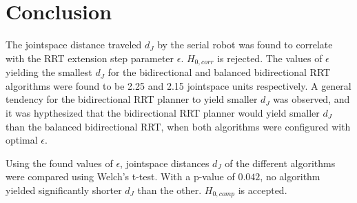 \section{Conclusion} 
The jointspace distance traveled \(d_J\) by the serial robot was
found to correlate with the RRT extension step parameter \(\epsilon\).
\(H_{0,corr}\) is rejected.
The values of \(\epsilon\) yielding the smallest \(d_J\) for the
bidirectional and balanced bidirectional RRT algorithms
were found to be 2.25 and 2.15 jointspace units respectively.
A general tendency for the bidirectional RRT planner
to yield smaller \(d_J\) was observed, and it was hypthesized
that the bidirectional RRT planner would yield smaller \(d_J\)
than the balanced bidirectional RRT, when both algorithms
were configured with optimal \(\epsilon\).

Using the found values of \(\epsilon\),
jointspace distances \(d_J\) of the different algorithms were compared
using Welch's t-test. With a p-value of \(0.042\),
no algorithm yielded significantly shorter \(d_J\) than the other.
\(H_{0,comp}\) is accepted.